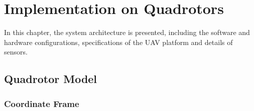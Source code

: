 \chapter{Implementation on Quadrotors}\label{implementation}

In this chapter, the system architecture is presented, including the software and hardware configurations, specifications of the UAV platform and details of sensors.

\section{Quadrotor Model}

\subsection{Coordinate Frame}

